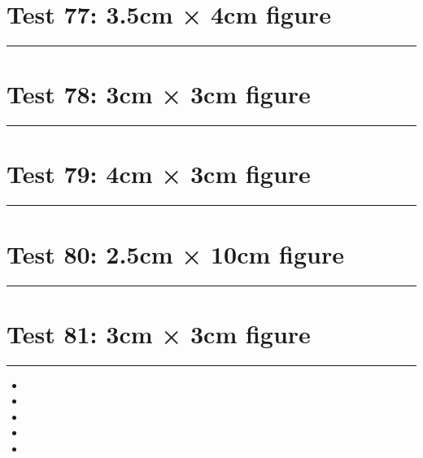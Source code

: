 \documentclass[a4paper,11pt]{article}
\begin{document}
\section*{Test 77: 3.5cm × 4cm figure}
\begin{swarmwrap}%
  \begin{minipage}[t]{3cm}
    \centering
    \rule{\linewidth}{4cm}
  \end{minipage}%
\end{swarmwrap}%
\swarmwrapnext
\lipsum[119]
\lipsum[120]
\lipsum[121]
\lipsum[122]
\lipsum[123]
\section*{Test 78: 3cm × 3cm figure}
\begin{swarmwrap}%
  \begin{minipage}[t]{3cm}
    \centering
    \rule{\linewidth}{3cm}
  \end{minipage}%
\end{swarmwrap}%
\swarmwrapnext
\lipsum[119]
\lipsum[120]
\lipsum[121]
\section*{Test 79: 4cm × 3cm figure}
\begin{swarmwrap}%
  \begin{minipage}[t]{4cm}
    \centering
    \rule{\linewidth}{3cm}
  \end{minipage}%
\end{swarmwrap}%
\swarmwrapnext
\lipsum[139]
\lipsum[140]
\lipsum[141]
\section*{Test 80: 2.5cm × 10cm figure}
\begin{swarmwrap}%
  \begin{minipage}[t]{2cm}
    \centering
    \rule{\linewidth}{10cm}
  \end{minipage}%
\end{swarmwrap}%
\swarmwrapnext
\lipsum[35]
\lipsum[36]
\lipsum[37]
\lipsum[38]
\lipsum[39]
\section*{Test 81: 3cm × 3cm figure}
\begin{swarmwrap}%
  \begin{minipage}[t]{3cm}
    \centering
    \rule{\linewidth}{3cm}
  \end{minipage}%
\end{swarmwrap}%
\swarmwrapnext
\lipsum[95]
\begin{itemize}
  \item \lipsum[96][1-3]
  \item \lipsum[97][1-3]
  \item \lipsum[98][1-3]
  \item \lipsum[99][1-3]
  \item \lipsum[100][1-3]
\end{itemize}
\end{document}
